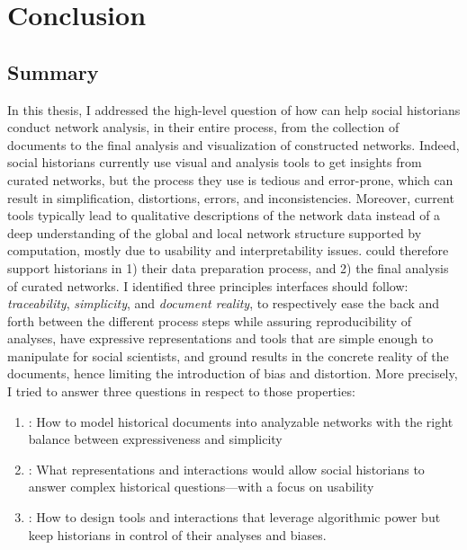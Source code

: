 \chapter{Conclusion}\label{ch:conclusion}
\minitoc

\section{Summary}

In this thesis, I addressed the high-level question of how \va can help social historians conduct network analysis, in their entire process, from the collection of documents to the final analysis and visualization of constructed networks.
Indeed, social historians currently use visual and analysis tools to get insights from curated networks, but the process they use is tedious and error-prone, which can result in simplification, distortions, errors, and inconsistencies\cite{alkadi2022, lemercier12FormalNetwork2015}.
Moreover, current tools typically lead to qualitative descriptions of the network data\cite{rollingerProlegomenaProblemsPerspectives2020} instead of a deep understanding of the global and local network structure supported by computation, mostly due to usability and interpretability issues.
\va could therefore support historians in 1) their data preparation process, and 2) the final analysis of curated networks.
I identified three principles \va interfaces should follow: \emph{traceability}, \emph{simplicity}, and \emph{document reality}, to respectively ease the back and forth between the different process steps while assuring reproducibility of analyses, have expressive representations and tools that are simple enough to manipulate for social scientists, and ground results in the concrete reality of the documents, hence limiting the introduction of bias and distortion.
More precisely, I tried to answer three questions in respect to those properties:
\begin{enumerate}
    \item \qone:  How to model historical documents into analyzable networks with the right balance between expressiveness and simplicity
    \item \qtwo: What representations and interactions would allow social historians to answer complex historical questions---with a focus on usability
    \item \qthree: How to design \va tools and interactions that leverage algorithmic power but keep historians in control of their analyses and biases.
\end{enumerate}
